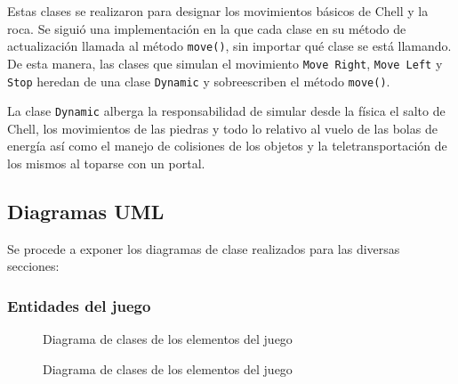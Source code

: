 \documentclass[a4paper]{article}
\begin{document}
Estas clases se realizaron para designar los movimientos básicos de Chell y la roca. Se siguió una implementación en la que cada clase en su método de actualización llamada al método \texttt{move()}, sin importar qué clase se está llamando. De esta manera, las clases que simulan el movimiento \texttt{Move Right}, \texttt{Move Left} y \texttt{Stop} heredan de una clase \texttt{Dynamic} y sobreescriben el método \texttt{move()}.

La clase \texttt{Dynamic} alberga la responsabilidad de simular desde la física el salto de Chell, los movimientos de las piedras y todo lo relativo al vuelo de las bolas de energía así como el manejo de colisiones de los objetos y la teletransportación de los mismos al toparse con un portal.

\subsection{Diagramas UML}

Se procede a exponer los diagramas de clase realizados para las diversas secciones:

\subsubsection{Entidades del juego}

\begin{figure}[!h]
	\caption{Diagrama de clases de los elementos del juego}
	\label{fig:diagrama1}
\end{figure}

\begin{figure}[!h]
	\caption{Diagrama de clases de los elementos del juego}
	\label{fig:diagrama2}
\end{figure}
\end{document}
